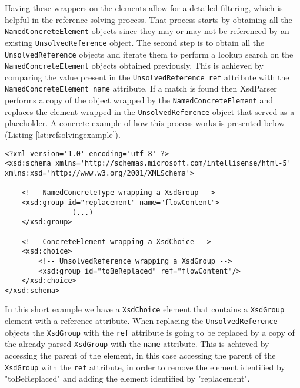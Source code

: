 \noindent
Having these wrappers on the elements allow for a detailed filtering, which is helpful in the reference solving process. That process starts by obtaining all the \texttt{NamedConcreteElement} objects since they may or may not be referenced by an existing \texttt{UnsolvedReference} object. The second step is to obtain all the \texttt{UnsolvedReference} objects and iterate them to perform a lookup search on the \texttt{NamedConcreteElement} objects obtained previously. This is achieved by comparing the value present in the \texttt{UnsolvedReference ref} attribute with the \texttt{NamedConcreteElement name} attribute. If a match is found then XsdParser performs a copy of the object wrapped by the \texttt{NamedConcreteElement} and replaces the element wrapped in the \texttt{UnsolvedReference} object that served as a placeholder. A concrete example of how this process works is presented below (Listing \ref{lst:refsolvingexample}).


\begin{minipage}{\linewidth}
\begin{lstlisting}[caption={Reference Solving Example},captionpos=b,label={lst:refsolvingexample}]
<?xml version='1.0' encoding='utf-8' ?>
<xsd:schema xmlns='http://schemas.microsoft.com/intellisense/html-5' xmlns:xsd='http://www.w3.org/2001/XMLSchema'>
	
    <!-- NamedConcreteType wrapping a XsdGroup -->
    <xsd:group id="replacement" name="flowContent">
				(...)
    </xsd:group>
	
    <!-- ConcreteElement wrapping a XsdChoice -->
    <xsd:choice>
        <!-- UnsolvedReference wrapping a XsdGroup -->
        <xsd:group id="toBeReplaced" ref="flowContent"/>
    </xsd:choice>
</xsd:schema>
\end{lstlisting}
\end{minipage}

\noindent
In this short example we have a \texttt{XsdChoice} element that contains a \texttt{XsdGroup} element with a reference attribute. When replacing the \texttt{UnsolvedReference} objects the \texttt{XsdGroup} with the \texttt{ref} attribute is going to be replaced by a copy of the already parsed \texttt{XsdGroup} with the \texttt{name} attribute. This is achieved by accessing the parent of the element, in this case accessing the parent of the \texttt{XsdGroup} with the \texttt{ref} attribute, in order to remove the element identified by "toBeReplaced" and adding the element identified by "replacement".


